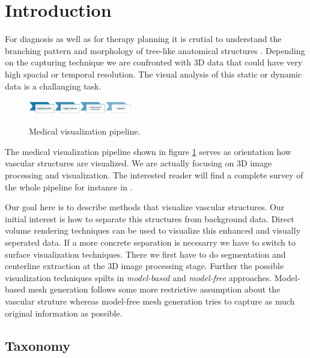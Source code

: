 \section{Introduction}


For diagnosis as well as for therapy planning it is crutial to understand the branching pattern and morphology of tree-like anatomical structures \cite{preim2013visual}.
Depending on the capturing technique we are confronted with 3D data that could have very high spacial or temporal resolution. The visual analysis of this static or dynamic data is a challanging task.

\begin{figure}[h]
	\centering
	\includegraphics[width=0.4\textwidth]{./Images/MedicalVisualizationPipeline.png} \\
	\caption{Medical visualization pipeline.}
	\label{fig:MedicalVisualizationPipeline}
\end{figure}

The medical visualization pipeline shown in figure \ref{fig:MedicalVisualizationPipeline} serves as orientation how vascular structures are visualized. We are actually focusing on 3D image processing and visualization. The interested reader will find a complete survey of the whole pipeline for instance in \cite{preim2013visual}. 

Our goal here is to describe methods that visualize vascular structures. Our initial interest is how to separate this structures from background data. Direct volume rendering techniques can be used to visualize this enhanced and visually seperated data. If a more concrete separation is necesarry we have to switch to surface visualization techniques.
There we first have to do segmentation and centerline extraction at the 3D image processing stage. Further the possible visualization techniques spilts in \emph{model-based} and \emph{model-free} approaches. 
Model-based mesh generation follows some more restrictive assumption about the vascular struture whereas model-free mesh generation tries to capture as much original information as possible.


\subsection{Taxonomy}

